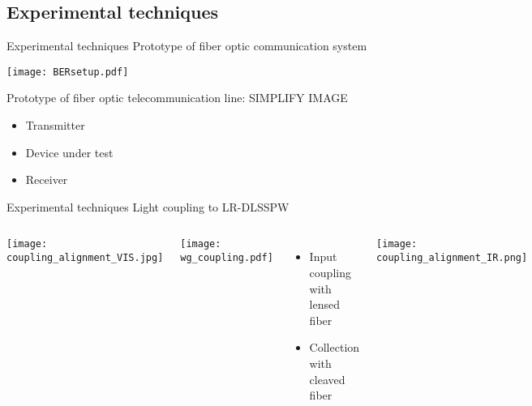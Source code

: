   \subsection{Experimental techniques} %
  \label{sub:experimental_techniques}
  
  \begin{frame}{Experimental techniques}
               {Prototype of fiber optic communication system}
   \begin{center}
    \texttt{[image: BERsetup.pdf]}
   \end{center}
    Prototype of fiber optic telecommunication line: \alert{SIMPLIFY IMAGE}
    \begin{itemize}
      \item Transmitter
      \item Device under test
      \item Receiver
    \end{itemize}
  \end{frame}

  \begin{frame}{Experimental techniques}
               {Light coupling to LR-DLSSPW}
    \begin{columns}
        \texttt{[image: coupling\_alignment\_VIS.jpg]}
        \begin{center}
          \texttt{[image: wg\_coupling.pdf]}          
        \end{center}
        \begin{itemize}
          \item Input coupling with lensed fiber
          \item Collection with cleaved fiber
        \end{itemize}
        \vspace{2mm}
        \texttt{[image: coupling\_alignment\_IR.png]}
    \end{columns}
  \end{frame}

